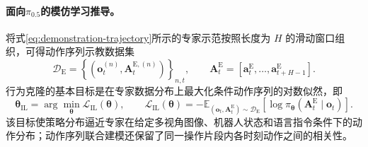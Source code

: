 \paragraph{面向\(\pi_{0.5}\)的模仿学习推导。}将式\eqref{eq:demonstration-trajectory}所示的专家示范按照长度为 \(H\) 的滑动窗口组织，可得动作序列示教数据集
\begin{equation}
  \mathcal D_{\mathrm E}
  =
  \left\{
    \left(\mathbf o_t^{(n)},\mathbf A_t^{\mathrm E,(n)}\right)
  \right\}_{n,t},
  \qquad
  \mathbf A_t^{\mathrm E}
  =
  \left[
    \mathbf a_t^{\mathrm E},\ldots,
    \mathbf a_{t+H-1}^{\mathrm E}
  \right].
  \label{eq:completed-pi-demonstration-dataset}
\end{equation}
行为克隆的基本目标是在专家数据分布上最大化条件动作序列的对数似然，即
\begin{equation}
  \boldsymbol\theta_{\mathrm{IL}}
  =
  \arg\min_{\boldsymbol\theta}\mathcal L_{\mathrm{IL}}(\boldsymbol\theta),
  \qquad
  \mathcal L_{\mathrm{IL}}(\boldsymbol\theta)
  =
  -\mathbb E_{(\mathbf o_t,\mathbf A_t^{\mathrm E})\sim\mathcal D_{\mathrm E}}
  \left[
    \log \pi_{\boldsymbol\theta}
    \left(\mathbf A_t^{\mathrm E}\mid\mathbf o_t\right)
  \right].
  \label{eq:completed-pi-il-nll}
\end{equation}
该目标使策略分布逼近专家在给定多视角图像、机器人状态和语言指令条件下的动作分布；动作序列联合建模还保留了同一操作片段内各时刻动作之间的相关性。

